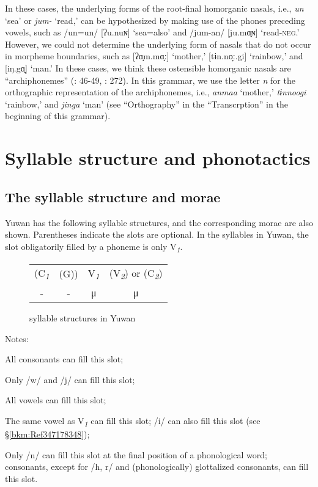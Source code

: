 In these cases, the underlying forms of the root-final homorganic nasals, i.e., \textit{un} ‘sea’ or \textit{jum-} ‘read,’ can be hypothesized by making use of the phones preceding vowels, such as /un=un/ [ʔu.nuɴ] ‘sea=also’ and /jum-an/ [ju.mɑ̟ɴ] ‘read-\textsc{neg}.’ However, we could not determine the underlying form of nasals that do not occur in morpheme boundaries, such as [ʔɑ̟m.mɑ̟ː] ‘mother,’ [tɨn.no̞ː.gi] ‘rainbow,’ and [iŋ.gɑ̟] ‘man.’ In these cases, we think these ostensible homorganic nasals are “archiphonemes” (\citealt{Lass1984}: 46-49, \citealt{Dixon2010}: 272). In this grammar, we use the letter \textit{n} for the orthographic representation of the archiphonemes, i.e., \textit{anmaa} ‘mother,’ \textit{tɨnnoogi} ‘rainbow,’ and \textit{jinga} ‘man’ (see “Orthography” in the “Transcrption” in the beginning of this grammar).

\section{Syllable structure and phonotactics}
\label{bkm:Ref302599307}\hypertarget{RefHeadingToc395696969}{}\subsection{The syllable structure and morae}
\label{bkm:Ref301830963}\hypertarget{RefHeadingToc395696970}{}\label{bkm:Ref381399409}
Yuwan has the following syllable structures, and the corresponding morae are also shown. Parentheses indicate the slots are optional. In the syllables in Yuwan, the slot obligatorily filled by a phoneme is only V\textit{\textsubscript{1}}.

\begin{figure}
\caption{syllable structures in Yuwan}
\begin{tabular}{cccc}
 (C\textit{\textsubscript{1}} & (G)) & V\textit{\textsubscript{1}} & (V\textit{\textsubscript{2}})  or  (C\textit{\textsubscript{2}})\\
 {}- & {}- & μ  & μ\\
\end{tabular}
\end{figure}

Notes: 
\begin{description}[font=\normalfont]
\item[C\textit{\textsubscript{1}}:] All consonants can fill this slot;
\item[G:] Only /w/ and /j/ can fill this slot;
\item[V\textit{\textsubscript{1}}:] All vowels can fill this slot;
\item[V\textit{\textsubscript{2}}:] The same vowel as V\textit{\textsubscript{1}} can fill this slot; /i/ can also fill this slot (see §\ref{bkm:Ref347178348});
\item[C\textit{\textsubscript{2}}:] Only /n/ can fill this slot at the final position of a phonological word; consonants, except for /h, r/ and (phonologically) glottalized consonants, can fill this slot.
\end{description}


